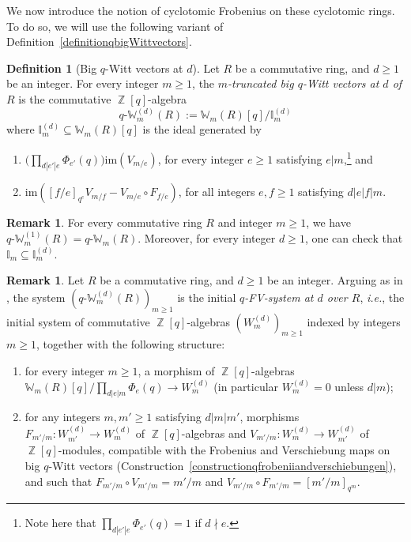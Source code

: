 \documentclass[10pt,twoside]{scrarticle}
\newlength{\mar} \setlength{\mar}{1cm}%
\newlength{\len}
\theoremstyle{definition}
\newtheorem{remark}[theorem]{Remark}
\newtheorem{definition}[theorem]{Definition}
\DeclareMathOperator{\Z}{\mathbb{Z}}
\newcommand{\W}{\mathbb{W}}
\newcommand{\Wm}{\mathbb{W}_m}
\newcommand{\qWm}{q\text{-}\mathbb{W}_m}
\renewcommand{\ge}{\geqslant}
\numberwithin{equation}{theorem}
\begin{document}
We now introduce the notion of cyclotomic Frobenius on these cyclotomic rings. To do so, we will use the following variant of Definition~\ref{definitionqbigWittvectors}.

\begin{definition}[Big $q$-Witt vectors at $d$]\label{definitionbigqWittvectorsatd}
    Let $R$ be a commutative ring, and $d \ge 1$ be an integer. For every integer $m \ge 1$, the \emph{$m$-truncated big $q$-Witt vectors at $d$ of $R$} is the commutative $\Z[q]$-algebra
    $$\qWm^{(d)}(R) := \Wm(R)[q]/\mathbb{I}_m^{(d)}$$
    where $\mathbb{I}^{(d)}_m \subseteq \W_m(R)[q]$ is the ideal generated by
    \begin{enumerate}[label=(\roman*)]
        \item $\big(\prod_{d|e'|e} \Phi_{e'}(q)\big)\text{im}(V_{m/e})$, for every integer $e \ge 1$ satisfying $e|m$,\footnote{Note here that $\prod_{d|e'|e} \Phi_{e'}(q) = 1$ if $d \nmid e$.} and
        \item $\text{im}([f/e]_{q^e} V_{m/f} - V_{m/e} \circ F_{f/e})$, for all integers $e,f \ge 1$ satisfying $d|e|f|m$.
    \end{enumerate}
\end{definition}

\begin{remark}
    For every commutative ring $R$ and integer $m \ge 1$, we have $\qWm^{(1)}(R) = \qWm(R)$. Moreover, for every integer $d \ge 1$, one can check that $\mathbb{I}_m \subseteq \mathbb{I}_m^{(d)}$.
\end{remark}

\begin{remark}\label{remarkuniversalpropertyqWittvectorsatd}
    Let $R$ be a commutative ring, and $d \ge 1$ be an integer. Arguing as in \cite[Lemma~2.9]{wagner_q-witt_2024}, the system $(\qWm^{(d)}(R))_{m \ge 1}$ is the initial \emph{$q$-FV-system at $d$ over $R$}, \emph{i.e.}, the initial system of commutative $\Z[q]$-algebras $(W_m^{(d)})_{m \ge 1}$ indexed by integers $m \ge 1$, together with the following structure:
    \begin{enumerate}[label=(\roman*)]
        \item for every integer $m \ge 1$, a morphism of $\Z[q]$-algebras $\W_m(R)[q]/\prod_{d|e|m}\Phi_e(q) \rightarrow W_m^{(d)}$ (in particular $W^{(d)}_m=0$ unless $d|m$);
        \item for any integers $m,m' \ge 1$ satisfying $d|m|m'$, morphisms $F_{m'/m} :W_{m'}^{(d)} \rightarrow W_m^{(d)}$ of $\Z[q]$\nobreakdash-algebras and $V_{m'/m} : W_m^{(d)} \rightarrow W_{m'}^{(d)}$ of $\Z[q]$-modules, compatible with the Frobenius and Verschiebung maps on big $q$-Witt vectors (Construction~\ref{constructionqfrobeniiandverschiebungen}), and such that $F_{m'/m} \circ V_{m'/m} = m'/m$ and $V_{m'/m} \circ F_{m'/m} = [m'/m]_{q^m}$.
    \end{enumerate}
\end{remark}
\end{document}
